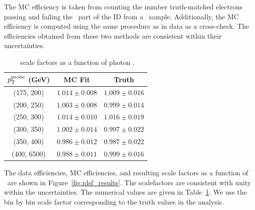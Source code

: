 The MC efficiency is taken from counting the number truth-matched electrons passing and failing the \egamma\ part of the ID from a \Zee\ sample. 
Additionally, the MC efficiency is computed using the same procedure as in data as a cross-check.
The efficiencies obtained from these two methods are consistent within their uncertainties. 

\begin{table}[htbp]
  \centering
  \begin{tabular}{ c|c|c }
    $p_{\mathrm{T}}^{\mathrm{probe}}$ (GeV) & MC Fit & Truth \\\hline
    (175, 200)  & $1.014 \pm 0.008$ & $1.009 \pm 0.016$ \\
    (200, 250)  & $1.003 \pm 0.008$ & $0.999 \pm 0.014$ \\
    (250, 300)  & $1.014 \pm 0.010$ & $1.016 \pm 0.019$ \\
    (300, 350)  & $1.002 \pm 0.014$ & $0.997 \pm 0.022$ \\
    (350, 400)  & $0.986 \pm 0.012$ & $0.987 \pm 0.022$ \\
    (400, 6500)  & $0.988 \pm 0.011$ & $0.999 \pm 0.016$ \\
  \end{tabular}
  \caption{\egamma\ scale factors as a function of photon \pt.}
  \label{tab:idsf_results}
\end{table}

The data efficiencies, MC efficiencies, and resulting scale factors as a function of \pt\ are shown in Figure~\ref{fig:idsf_results}. 
The scalefactors are consistent with unity within the uncertainties. 
The numerical values are given in Table~\ref{tab:idsf_results}. 
We use the bin by bin scale factor corresponding to the truth values in the analysis. %
